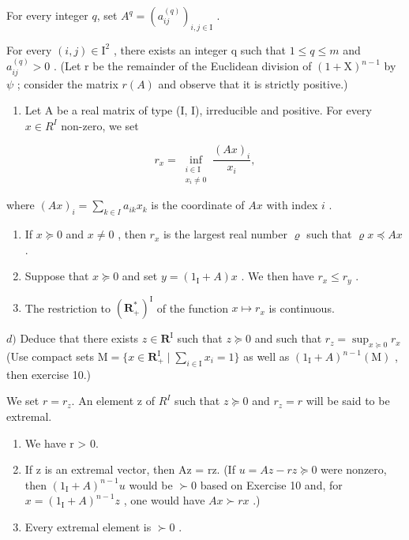 For every integer \(q\), set \(A^q = (a_{ij}^{(q)})_{i,j \in \mathrm{I}}\) .

For every \((i,j)\in\mathrm{I}^{2}\) , there exists an integer q such that \(1\leqslant q\leqslant m\) and \(a_{ij}^{(q)}>0\) . (Let r be the remainder of the Euclidean division of \((1+\mathrm{X})^{n-1}\) by \(\psi\) ; consider the matrix \(r(A)\) and observe that it is strictly positive.)

\begin{enumerate}
\def\labelenumi{\arabic{enumi})}
\setcounter{enumi}{11}
\tightlist
\item
  Let A be a real matrix of type (I, I), irreducible and positive. For every \(x \in R^{I}\) non-zero, we set
\end{enumerate}

\[
r_{x} = \inf_{\substack{i\in \mathrm{I}\\ x_{i}\neq 0}}\frac{(Ax)_{i}}{x_{i}},
\]

where \((Ax)_i = \sum_{k\in I}a_{ik}x_k\) is the coordinate of \(Ax\) with index \(i\) .

\begin{enumerate}
\def\labelenumi{\alph{enumi})}
\item
  If \(x \succcurlyeq 0\) and \(x \neq 0\) , then \(r_x\) is the largest real number \(\varrho\) such that \(\varrho x \preccurlyeq Ax\) .
\item
  Suppose that \(x \succcurlyeq 0\) and set \(y = (1_{\mathrm{I}} + A)x\) . We then have \(r_x \leqslant r_y\) .
\item
  The restriction to \((\mathbf{R}_{+}^{*})^{\mathrm{I}}\) of the function \(x \mapsto r_{x}\) is continuous.
\end{enumerate}

\(d)\) Deduce that there exists \(z \in \mathbf{R}^{\mathrm{I}}\) such that \(z \succcurlyeq 0\) and such that \(r_z = \sup_{x \succcurlyeq 0} r_x\) (Use compact sets \(\mathrm{M} = \{x \in \mathbf{R}_{+}^{\mathrm{I}} \mid \sum_{i \in \mathrm{I}} x_i = 1\}\) as well as \((1_{\mathrm{I}} + A)^{n-1}(\mathrm{M})\) , then exercise 10.)

We set \(r = r_{z}\). An element z of \(R^{I}\) such that \(z \succcurlyeq 0\) and \(r_{z} = r\) will be said to be extremal.

\begin{enumerate}
\def\labelenumi{\alph{enumi})}
\setcounter{enumi}{4}
\item
  We have r \textgreater{} 0.
\item
  If z is an extremal vector, then Az = rz. (If \(u = Az - rz \succcurlyeq 0\) were nonzero, then \((1_{\mathrm{I}} + A)^{n-1}u\) would be \(\succ 0\) based on Exercise 10 and, for \(x = (1_{\mathrm{I}} + A)^{n-1}z\) , one would have \(Ax \succ rx\) .)
\item
  Every extremal element is \(\succ 0\) .
\end{enumerate}

